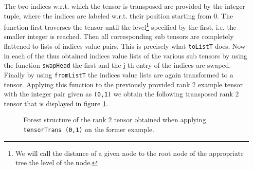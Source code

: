 \documentclass[a4paper,12pt, DIV=14, BCOR=5mm, twoside, headsepline]{scrbook}
\begin{document}
The two indices w.r.t. which the tensor is transposed are provided by the integer tuple, where the indices are labeled w.r.t. their position starting from 0. The function first traverses the tensor until the level\footnote{We will call the distance of a given node to the root node of the appropriate tree the level of the node.} specified by the first, i.e. the smaller integer is reached. Then all corresponding sub tensors are completely flattened to lists of indices value pairs. This is precisely what \texttt{toListT} does. Now in each of the thus obtained indices value lists of the various sub tensors by using the function \texttt{swapHead} the first and the j-th entry of the indices are swaped. Finally by using  \texttt{fromListT} the indices value lists are again transformed to a tensor.  Applying this function to the previously provided rank 2 example tensor with the integer pair given as \texttt{(0,1)} we obtain the following transposed rank 2 tensor that is displayed in figure \ref{ExampleTensTrans}.

\begin{figure}[ht]
\centering
{}
\caption{Forest structure of the rank 2 tensor obtained when applying \texttt{tensorTrans (0,1)} on the former example.}
\label{ExampleTensTrans}
\end{figure}
\end{document}
